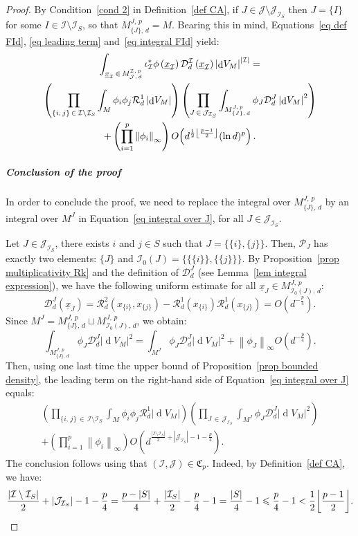 \documentclass[10pt]{amsart}
\theoremstyle{definition}\newtheorem{defi}[theo]{Definition}\newtheorem{rema}[theo]{Remark}\newtheorem{exam}[theo]{Example}\newtheorem{exem}[theo]{Example}\newtheorem{nota}[theo]{Notation}
\DeclareMathOperator{\dmesure}{d}
\DeclarePairedDelimiter{\floor}{\lfloor}{\rfloor}
\newcommand{\D}{\mathcal{D}}
\newcommand{\I}{\mathcal{I}}
\newcommand{\J}{\mathcal{J}}
\newcommand{\clR}{\mathcal{R}}
\newcommand{\frkC}{\mathfrak{C}}
\newcommand{\pa}{\mathcal{P}\!}
\newcommand{\norm}[1]{\left\lvert #1 \right\rvert}
\newcommand{\Norm}[1]{\left\lVert #1 \right\rVert}
\newcommand{\rmes}[1]{\norm{\dmesure\! V_{#1}}}
\renewcommand{\leq}{\leqslant}
\begin{document}
\begin{proof}
By Condition~\eqref{cond 2} in Definition~\ref{def CA}, if $J \in \J \setminus \J_{\I_S}$ then $J = \{I\}$ for some $I \in \I \setminus \I_S$, so that $M^{J,\,p}_{\{J\},\,d} = M$. Bearing this in mind, Equations~\eqref{eq def FId}, \eqref{eq leading term} and~\eqref{eq integral FId} yield:
\begin{multline}\label{eq integral over J}
\int_{\underline{x}_\I\,\in\,M^{\I,\,p}_{\J,\,d}} \iota_\I^*\phi\left(\underline{x}_\I\right) \D^\I_d\left(\underline{x}_\I\right) \rmes{M}^{\norm{\I}}= \\
\left(\prod_{\{i,\,j\}\,\in\,\I\setminus \I_S} \int_M \phi_i\phi_j\clR^1_d \rmes{M}\right) \left(\prod_{J\,\in\,\J_{\I_S}} \int_{M^{J,\,p}_{\{J\},\,d}}\phi_J \D_d^J \rmes{M}^2 \right)\\
+ \left(\prod_{i=1}^p \Norm{\phi_i}_\infty\right) O\!\left(d^{\frac{1}{2}\floor*{\frac{p-1}{2}}}(\ln d)^p\right).
\end{multline}

\subparagraph*{Conclusion of the proof}
In order to conclude the proof, we need to replace the integral over $M^{J,\,p}_{\{J\},\,d}$ by an integral over $M^J$ in Equation~\eqref{eq integral over J}, for all $J \in \J_{\I_S}$.

Let $J \in \J_{\I_S}$, there exists $i$ and $j \in S$ such that $J = \{\{i\},\{j\}\}$. Then, $\pa_J$ has exactly two elements: $\{J\}$ and $\I_0(J) = \{\{\{i\}\},\{\{j\}\}\}$. By Proposition~\ref{prop multiplicativity Rk} and the definition of $\D_d^J$ (see Lemma~\ref{lem integral expression}), we have the following uniform estimate for all $\underline{x}_J \in M^{J,\,p}_{\I_0(J),\,d}$:
\[
\D_d^J\left(\underline{x}_J\right) = \clR^2_d\left(x_{\{i\}},x_{\{j\}}\right) - \clR^1_d\left(x_{\{i\}}\right)\clR^1_d\left(x_{\{j\}}\right) = O\left(d^{-\frac{p}{4}}\right).
\]
Since $M^J = M^{J,\,p}_{\{J\},\,d} \sqcup M^{J,\,p}_{\I_0(J),\,d}$, we obtain:
\[
\int_{M^{J,\,p}_{\{J\},\,d}} \phi_J \D_d^J \rmes{M}^2 = \int_{M^J} \phi_J \D_d^J \rmes{M}^2 + \Norm{\phi_J}_\infty O\left(d^{-\frac{p}{4}}\right).
\]
Then, using one last time the upper bound of Proposition~\ref{prop bounded density}, the leading term on the right-hand side of Equation~\eqref{eq integral over J} equals:
\begin{multline*}
\left(\prod_{\{i,\,j\}\,\in\,\I \setminus \I_S} \int_M \phi_i\phi_j\clR^1_d \rmes{M}\right)\left(\prod_{J\,\in\,\J_{\I_S}} \int_{M^J} \phi_J \D_d^J \rmes{M}^2 \right)\\
+ \left(\prod_{i=1}^p \Norm{\phi_i}_\infty\right) O\left(d^{\frac{\norm{\I \setminus \I_S}}{2}+\norm{\J_{\I_S}}-1-\frac{p}{4}}\right).
\end{multline*}
The conclusion follows using that $(\I,\J) \in\frkC_p$. Indeed, by Definition~\ref{def CA}, we have:
\[
\frac{\norm{\I \setminus \I_S}}{2}+\norm{\J_{\I_S}}-1-\frac{p}{4} = \frac{p-\norm{S}}{4} + \frac{\norm{\I_S}}{2} - \frac{p}{4} -1 = \frac{\norm{S}}{4}-1 \leq \frac{p}{4}-1 < \frac{1}{2}\floor*{\frac{p-1}{2}}.\qedhere
\]
\end{proof}
\end{document}
